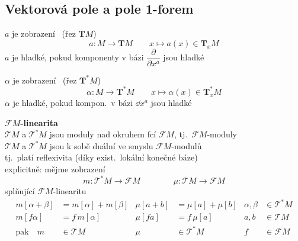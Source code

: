 \newpage
{}
\subsection{Vektorová pole a pole 1-forem}

\begin{definice}
 $a$ je zobrazení \ (řez $\mathbf{T}M$)
\[
  a: M\to\mathbf{T}M \qquad x\mapsto a(x)\in\mathbf{T}_xM
\]
$a$ je hladké, pokud komponenty v bázi $\dfrac{\partial}{\partial x^a}$ jsou hladké
\end{definice}
\begin{definice}
 $\alpha$ je zobrazení \ (řez $\mathbf{T}^*M$)
\[
  \alpha: M\to\mathbf{T}^*M \qquad x\mapsto\alpha(x)\in\mathbf{T}^*_xM
\]
$\alpha$ je hladké, pokud kompon.\ v bázi $\dd x^a$ jsou hladké
\end{definice}

\textbf{$\mathcal{F}M$-linearita} \\
\quad $\mathcal{T}M$ a $\mathcal{T}^*M$ jsou moduly nad okruhem fcí $\mathcal{F}M$, tj.\ $\mathcal{F}M$-moduly \\
\quad $\mathcal{T}M$ a $\mathcal{T}^*M$ jsou k sobě duální ve smyslu $\mathcal{F}M$-modulů \\
\quad tj.\ platí reflexivita (díky exist.\ lokální konečné báze) \\
\quad explicitně: mějme zobrazení
\[
  m:\mathcal{T}^*M\to\mathcal{F}M \qquad\qquad \mu:\mathcal{T}M\to\mathcal{F}M
\]
\quad splňující $\mathcal{F}M$-linearitu
\begin{align*}
  m[\alpha+\beta] &= m[\alpha] + m[\beta] & \mu[a+b] &= \mu[a] + \mu[b] & \alpha,\beta&\in\mathcal{T}^*M \\
  m[f\alpha] &= f\,m[\alpha] & \mu[fa] &= f\,\mu[a] & a,b&\in\mathcal{T}M \\
  \text{pak}\quad m &\in\mathcal{T}M & \mu &\in\mathcal{T}^*M & f&\in\mathcal{F}M
\end{align*}
\quad {}

